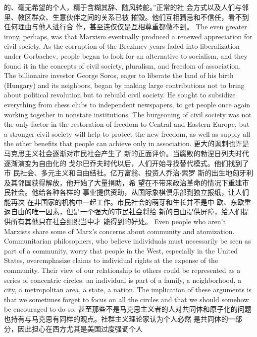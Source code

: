 \begin{paracol}{2}
的、毫无希望的个人，精于含糊其辞、随风转舵。”正常的社
会方式以及人们与邻里、教区群众、生意伙伴之间的关系已被
摧毁。他们互相猜忌和不信任，看不到任何理由与他人进行合
作，甚至连仅仅是互相尊重都做不到。
\switchcolumn*
The even greater irony, perhaps, was that Marxism eventually produced a renewed appreciation for civil society. As the
corruption of the Brezhnev years faded into liberalization under
Gorbachev, people began to look for an alternative to socialism,
and they found it in the concepts of civil society, pluralism, and
freedom of association. The billionaire investor George Soros,
eager to liberate the land of his birth (Hungary) and its neighbors, began by making large contributions not to bring about
political revolution but to rebuild civil society. He sought to
subsidize everything from chess clubs to independent newspapers, to get people once again working together in nonstate institutions. The burgeoning of civil society was not the only
factor in the restoration of freedom to Central and Eastern Europe, but a stronger civil society will help to protect the new
freedom, as well as supply all the other benefits that people can
achieve only in association.
\switchcolumn
更大的讽剌也许是马克思主义社会逐渐对市民社会产生了
新的正面评价。当腐败的勃涅日列夫时代逐渐演变为自由化的
戈尔巴乔夫时代以后，人们开始寻找替代模式。他们找到了市
民社会、多元主义和自由结社。亿万富翁、投资人乔治$\cdot$索罗
斯的出生地匈牙利及其邻国获得解放，他开始了大量捐助，希
望在不带来政治革命的情况下重建市民社会。他给各种各样的
事业提供资助，从国际象棋倶乐部到独立报纸，让人们能再次
在非国家的机构中一起工作。市民社会的萌芽和生长并不是中
欧、东欧重返自由的唯一因素，但是一个强大的市民社会将给
新的自由提供屏障，给人们提供所有其他只在社会组织当中才
能得到的好处。
\switchcolumn*
Even people who aren't Marxists share some of Marx's concerns about community and atomization. Communitarian
philosophers, who believe individuals must necessarily be seen
as part of a community, worry that people in the West, especially in the United States, overemphasize claims to individual
rights at the expense of the community. Their view of our relationship to others could be represented as a series of concentric
circles: an individual is part of a family, a neighborhood, a city, a
metropolitan area, a state, a nation. The implication of these arguments is that we sometimes forget to focus on all the circles
and that we should somehow be encouraged to do so.
\switchcolumn
甚至那些不是马克思主义者的人对共同体和原子化的问题
也持有与马克思有同样的观点。社群主义理论家认为个人必然
是共同体的一部分，因此担心在西方尤其是美国过度强调个人

\end{paracol}
